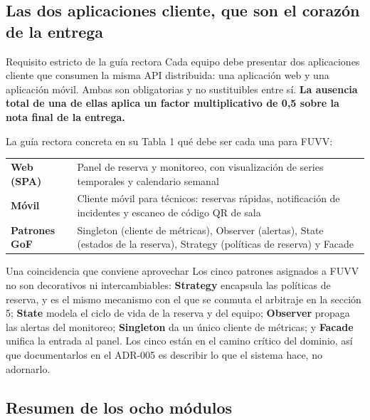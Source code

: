 \documentclass[11pt,a4paper]{article}
\begin{document}
\subsection{Las dos aplicaciones cliente, que son el corazón de la entrega}

\begin{pisoBox}{Requisito estricto de la guía rectora}
	Cada equipo debe presentar dos aplicaciones cliente que consumen la misma API distribuida: una aplicación web y una aplicación móvil. Ambas son obligatorias y no sustituibles entre sí. \textbf{La ausencia total de una de ellas aplica un factor multiplicativo de 0,5 sobre la nota final de la entrega.}
\end{pisoBox}

La guía rectora concreta en su Tabla 1 qué debe ser cada una para FUVV:

\begin{center}
	\small
	\begin{tabular}{@{}p{2.5cm}p{12.5cm}@{}}
		\toprule
		\textbf{Web (SPA)} & Panel de reserva y monitoreo, con visualización de series temporales y calendario semanal \\
		\addlinespace
		\textbf{Móvil} & Cliente móvil para técnicos: reservas rápidas, notificación de incidentes y escaneo de código QR de sala \\
		\addlinespace
		\textbf{Patrones GoF} & Singleton (cliente de métricas), Observer (alertas), State (estados de la reserva), Strategy (políticas de reserva) y Facade \\
		\bottomrule
	\end{tabular}
\end{center}

\begin{defBox}{Una coincidencia que conviene aprovechar}
	Los cinco patrones asignados a FUVV no son decorativos ni intercambiables: \textbf{Strategy} encapsula las políticas de reserva, y es el mismo mecanismo con el que se conmuta el arbitraje en la sección 5; \textbf{State} modela el ciclo de vida de la reserva y del equipo; \textbf{Observer} propaga las alertas del monitoreo; \textbf{Singleton} da un único cliente de métricas; y \textbf{Facade} unifica la entrada al panel. Los cinco están en el camino crítico del dominio, así que documentarlos en el ADR-005 es describir lo que el sistema hace, no adornarlo.
\end{defBox}

\subsection{Resumen de los ocho módulos}
\end{document}
